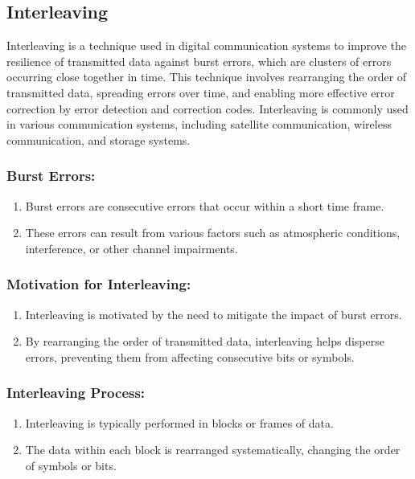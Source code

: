 \subsection{Interleaving}
Interleaving is a technique used in digital communication systems to improve the resilience of transmitted data against burst errors, which are clusters of errors occurring close together in time. This technique involves rearranging the order of transmitted data, spreading errors over time, and enabling more effective error correction by error detection and correction codes. Interleaving is commonly used in various communication systems, including satellite communication, wireless communication, and storage systems.
\subsubsection{Burst Errors:}
\begin{enumerate}
    \item Burst errors are consecutive errors that occur within a short time frame. 
    \item These errors can result from various factors such as atmospheric conditions, interference, or other channel impairments.
\end{enumerate}
\subsubsection{Motivation for Interleaving:}
\begin{enumerate}
    \item Interleaving is motivated by the need to mitigate the impact of burst errors.
    \item By rearranging the order of transmitted data, interleaving helps disperse errors, preventing them from affecting consecutive bits or symbols.
\end{enumerate}
\subsubsection{Interleaving Process:}
\begin{enumerate}
    \item Interleaving is typically performed in blocks or frames of data.
    \item The data within each block is rearranged systematically, changing the order of symbols or bits.
\end{enumerate}
